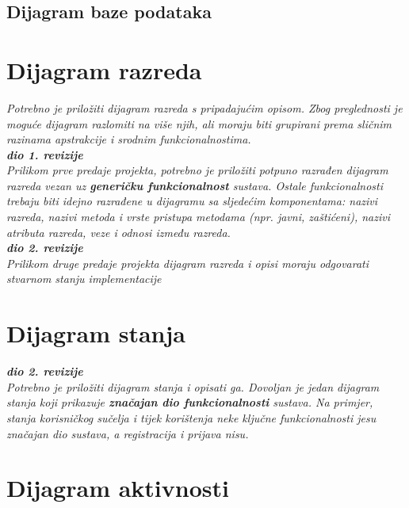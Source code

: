 			
			\subsection{Dijagram baze podataka}
				
			
			\eject
			
			
		\section{Dijagram razreda}
		
			\textit{Potrebno je priložiti dijagram razreda s pripadajućim opisom. Zbog preglednosti je moguće dijagram razlomiti na više njih, ali moraju biti grupirani prema sličnim razinama apstrakcije i srodnim funkcionalnostima.}\\
			
			\textbf{\textit{dio 1. revizije}}\\
			
			\textit{Prilikom prve predaje projekta, potrebno je priložiti potpuno razrađen dijagram razreda vezan uz \textbf{generičku funkcionalnost} sustava. Ostale funkcionalnosti trebaju biti idejno razrađene u dijagramu sa sljedećim komponentama: nazivi razreda, nazivi metoda i vrste pristupa metodama (npr. javni, zaštićeni), nazivi atributa razreda, veze i odnosi između razreda.}\\
			
			\textbf{\textit{dio 2. revizije}}\\			
			
			\textit{Prilikom druge predaje projekta dijagram razreda i opisi moraju odgovarati stvarnom stanju implementacije}
			
			
			
			\eject
		
		\section{Dijagram stanja}
			
			
			\textbf{\textit{dio 2. revizije}}\\
			
			\textit{Potrebno je priložiti dijagram stanja i opisati ga. Dovoljan je jedan dijagram stanja koji prikazuje \textbf{značajan dio funkcionalnosti} sustava. Na primjer, stanja korisničkog sučelja i tijek korištenja neke ključne funkcionalnosti jesu značajan dio sustava, a registracija i prijava nisu. }
			
			
			\eject 
		
		\section{Dijagram aktivnosti}
			
